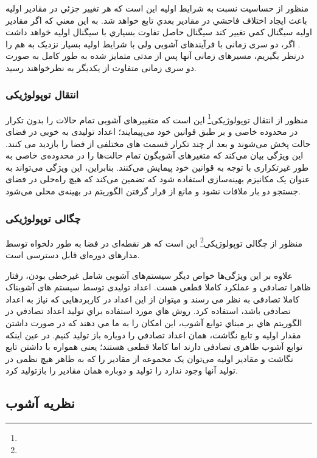 منظور از حساسيت نسبت به شرايط اوليه  اين است كه هر تغیير جزئي در مقادير اوليه باعث ايجاد اختلاف فاحشي در مقادير بعدي تابع خواهد شد.  به اين معني كه اگر مقادير اوليه سيگنال كمي تغيير كند سيگنال حاصل تفاوت بسياري با سيگنال اوليه خواهد داشت . اگر، دو سری زمانی با فرآیندهای آشوبی ولی با شرایط اولیه بسیار نزدیک به هم را درنظر بگیریم، مسیرهای زمانی آنها پس از مدتی متمایز شده به طور کامل به صورت دو سری زمانی متفاوت از یکدیگر به نظرخواهند رسید.

\subsubsection{انتقال توپولوژیکی}

منظور از انتقال توپولوژیکی\footnote{} این است که متغییرهای آشوبی تمام حالات را بدون تکرار در محدوده خاصی و بر طبق قوانین خود می‌پیمایند؛ اعداد تولیدی به خوبی در فضای حالت پخش می‌شوند و بعد از چند تکرار قسمت های مختلفی از فضا را بازدید می کنند. این ویژگی بیان می‌کند که متغیرهای آشوبگون تمام حالت‌ها را در محدوده‌ی خاصی به طور غیرتکراری با توجه به قوانین خود پیمایش می‌کنند. بنابراین، این ویژگی می‌تواند به عنوان یک مکانیزم بهینه‌سازی استفاده شود که تضمین می‌کند که هیچ راه‌حلی در فضای جستجو دو بار ملاقات نشود و مانع از قرار گرفتن الگوریتم در بهینه‌ی محلی می‌شود.

\subsubsection{چگالی توپولوژیکی}

منظور از چگالی توپولوژیکی\footnote{} این است که هر نقطه‌ای در فضا به طور دلخواه توسط مدارهای دوره‌ای قابل دسترسی است.

علاوه بر این ویژگی‌ها خواص دیگر سیستم‌های آشوبی شامل غیرخطی بودن، رفتار ظاهرا تصادفی و عملکرد کاملا قطعی هست. اعداد تولیدی توسط سیستم های آشوبناک کاملا تصادفی به نظر می رسند و میتوان از این اعداد در کاربردهایی که نیاز به اعداد تصادفی  باشد، استفاده کرد. روش هاي مورد استفاده براي توليد اعداد تصادفي در الگوريتم هاي بر مبناي توابع آشوب، اين امكان را به ما مي دهند كه در صورت داشتن مقدار اوليه و تابع نگاشت، همان اعداد تصادفي را دوباره باز توليد كنيم. در عین اینکه توابع آشوب ظاهری تصادفی دارند اما کاملا قطعی هستند؛ یعنی همواره با داشتن تابع نگاشت و مقادیر اولیه می‌توان یک مجموعه از مقادیر را که به ظاهر هیچ نظمی در تولید آنها وجود ندارد را تولید و دوباره همان مقادیر را بازتولید کرد.

\subsection{نظریه آشوب}

